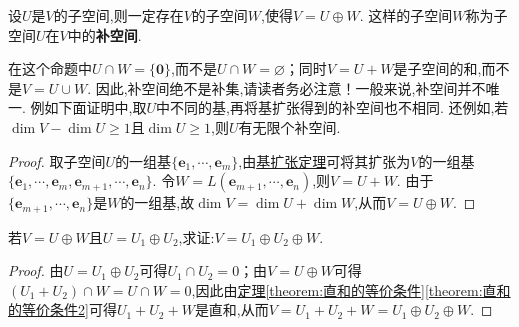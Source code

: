 \documentclass[lang=cn,newtx,10pt,scheme=chinese]{elegantbook}
\begin{document}
\begin{proposition}[任意子空间一定存在相应的补空间]\label{proposition:补空间}
设\(U\)是\(V\)的子空间,则一定存在\(V\)的子空间\(W\),使得\(V = U\oplus W\). 这样的子空间\(W\)称为子空间\(U\)在\(V\)中的\textbf{补空间}.
\end{proposition}
\begin{remark}
    在这个命题中\(U\cap W = \{ \boldsymbol{0}\}\),而不是\(U\cap W=\varnothing\)；同时\(V = U + W\)是子空间的和,而不是\(V = U\cup W\). 因此,补空间绝不是补集,请读者务必注意！一般来说,补空间并不唯一. 例如下面证明中,取$U$中不同的基,再将基扩张得到的补空间也不相同.
    还例如,若\(\dim V-\dim U\geq1\)且\(\dim U\geq1\),则\(U\)有无限个补空间.
\end{remark}
\begin{proof}
    取子空间\(U\)的一组基\(\{\boldsymbol{e}_1,\cdots,\boldsymbol{e}_m\}\),由\hyperref[theorem:基扩充定理]{基扩张定理}可将其扩张为\(V\)的一组基\(\{\boldsymbol{e}_1,\cdots,\boldsymbol{e}_m,\boldsymbol{e}_{m + 1},\cdots,\boldsymbol{e}_n\}\). 令\(W = L(\boldsymbol{e}_{m + 1},\cdots,\boldsymbol{e}_n)\),则\(V = U+W\). 由于\(\{\boldsymbol{e}_{m + 1},\cdots,\boldsymbol{e}_n\}\)是\(W\)的一组基,故\(\dim V=\dim U+\dim W\),从而\(V = U\oplus W\). 
\end{proof}

\begin{proposition}\label{proposition:直和的传递性}
若\(V = U\oplus W\)且\(U = U_1\oplus U_2\),求证:\(V = U_1\oplus U_2\oplus W\). 
\end{proposition}
\begin{proof}
    由\(U = U_1\oplus U_2\)可得\(U_1\cap U_2 = 0\)；由\(V = U\oplus W\)可得\((U_1 + U_2)\cap W=U\cap W = 0\),因此由\hyperref[theorem:直和的等价条件2]{定理\ref{theorem:直和的等价条件}\ref{theorem:直和的等价条件2}}可得\(U_1 + U_2+W\)是直和,从而\(V = U_1 + U_2+W = U_1\oplus U_2\oplus W\).
\end{proof}
\end{document}
